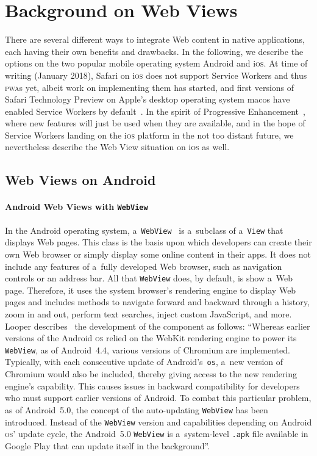 \documentclass[sigconf]{acmart}
\begin{document}
\section{Background on Web Views}
\label{sec:background}

There are several different ways to integrate Web content in native applications,
each having their own benefits and drawbacks.
In the following, we describe the options on the two popular
mobile operating system Android and i\textsc{os}.
At time of writing (January 2018), Safari on i\textsc{os}
does not support Service Workers and thus \textsc{pwa}s yet,
albeit work on implementing them has started, and
first versions of Safari Technology Preview on Apple's
desktop operating system mac{os} have enabled
Service Workers by default~\cite{davis2017safari}.
In the spirit of Progressive Enhancement~\cite{champeon2003progressiveenhancement},
where new features will just be used when they are available,
and in the hope of Service Workers landing on the i\textsc{os} platform
in the not too distant future,
we nevertheless describe the Web View situation on i\textsc{os} as well.

\subsection{Web Views on Android}

\paragraph{Android Web Views with \texttt{WebView}}

In the Android operating system, a~\texttt{WebView}~\cite{android2018webview}
is a~subclass of a~\texttt{View} that displays Web pages.
This class is the basis upon which developers can create their own Web browser
or simply display some online content in their apps.
It does not include any features of a~fully developed Web browser,
such as navigation controls or an address bar.
All that \texttt{WebView} does, by default, is show a~Web page.
Therefore, it uses the system browser's rendering engine to display Web pages
and includes methods to navigate forward and backward through a history,
zoom in and out, perform text searches, inject custom JavaScript, and more.
Looper describes~\cite{looper2015webviews}
the development of the component as follows:
``Whereas earlier versions of the Android \textsc{os}
relied on the WebKit rendering engine to power its \texttt{WebView},
as of Android~4.4, various versions of Chromium are implemented.
Typically, with each consecutive update of Android's~\texttt{os},
a~new version of Chromium would also be included, thereby giving access
to the new rendering engine's capability.
This causes issues in backward compatibility for developers
who must support earlier versions of Android.
To combat this particular problem, as of Android~5.0,
the concept of the auto-updating \texttt{WebView} has been introduced.
Instead of the \texttt{WebView} version and capabilities
depending on Android \textsc{os}' update cycle,
the Android~5.0 \texttt{WebView} is a~system-level \texttt{.apk} file
available in Google Play that can update itself in the background''.
\end{document}
